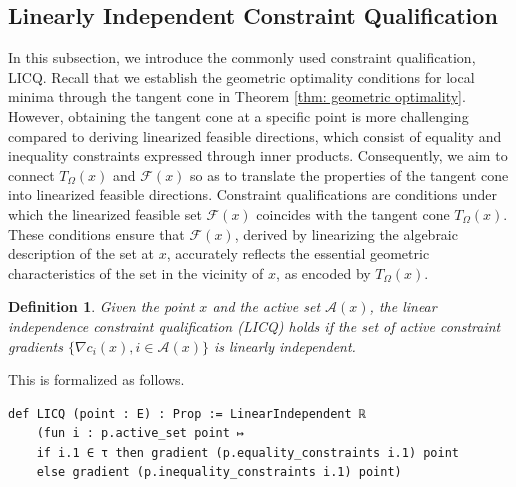 \documentclass[sn-mathphys]{JORSC-jnl}%
\theoremstyle{thmstyleone}%
\theoremstyle{thmstylethree}%
\newtheorem{definition}{Definition}%
\begin{document}
\subsection{Linearly Independent Constraint Qualification}
In this subsection, we introduce the commonly used constraint qualification, LICQ. Recall that we establish the geometric optimality conditions for local minima through the tangent cone in Theorem \ref{thm: geometric optimality}. However, obtaining the tangent cone at a specific point is more challenging compared to deriving linearized feasible directions, which consist of equality and inequality constraints expressed through inner products. Consequently, we aim to connect $T_\Omega(x)$ and $\mathcal{F}(x)$ so as to translate the properties of the tangent cone into linearized feasible directions. Constraint qualifications are conditions under which the linearized feasible set $\mathcal{F}(x)$ coincides with the tangent cone $T_\Omega(x)$. These conditions ensure that $\mathcal{F}(x)$, derived by linearizing the algebraic description of the set at $x$, accurately reflects the essential geometric characteristics of the set in the vicinity of $x$, as encoded by $T_\Omega(x)$.

\begin{definition}
    Given the point $x$ and the active set $\mathcal{A}(x)$, the linear independence constraint qualification (LICQ) holds if the set of active constraint gradients $\{\nabla c_i(x), i \in \mathcal{A}(x)\}$ is linearly independent.
\end{definition}
This is formalized as follows.
\begin{lstlisting}
def LICQ (point : E) : Prop := LinearIndependent ℝ
    (fun i : p.active_set point ↦ 
    if i.1 ∈ τ then gradient (p.equality_constraints i.1) point
    else gradient (p.inequality_constraints i.1) point)
\end{lstlisting}
\end{document}
